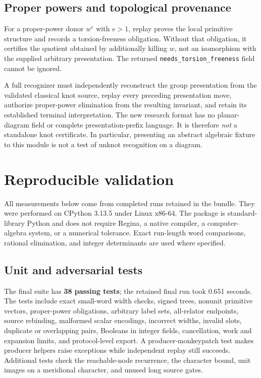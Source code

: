 \documentclass[11pt,letterpaper]{article}
\theoremstyle{definition}
\theoremstyle{remark}\newtheorem{remark}[theorem]{Remark}
\newcommand{\code}[1]{\texttt{\small #1}}
\begin{document}
\subsection{Proper powers and topological provenance}

For a proper-power donor $w^e$ with $e>1$, replay proves the local primitive
structure and records a torsion-freeness obligation. Without that obligation,
it certifies the quotient obtained by additionally killing $w$, not an
isomorphism with the supplied arbitrary presentation. The returned
\code{needs\_torsion\_freeness} field cannot be ignored.

A full recognizer must independently reconstruct the group presentation from
the validated classical knot source, replay every preceding presentation
move, authorize proper-power elimination from the resulting invariant, and
retain its established terminal interpretation. The new research format has
no planar-diagram field or complete presentation-prefix language. It is
therefore \emph{not} a standalone knot certificate. In particular, presenting
an abstract algebraic fixture to this module is not a test of unknot
recognition on a diagram.

\section{Reproducible validation}
\label{sec:audit}

All measurements below come from completed runs retained in the bundle. They
were performed on CPython 3.13.5 under Linux x86-64. The package is
standard-library Python and does not require Regina, a native compiler, a
computer-algebra system, or a numerical tolerance. Exact run-length word
comparisons, rational elimination, and integer determinants are used where
specified.

\subsection{Unit and adversarial tests}

The final suite has \textbf{38 passing tests}; the retained final run took
0.651 seconds. The tests include exact small-word width checks, signed trees,
nonunit primitive vectors, proper-power obligations, arbitrary label sets,
all-relator endpoints, source rebinding, malformed scalar encodings, incorrect
widths, invalid slots, duplicate or overlapping pairs, Booleans in integer
fields, cancellation, work and expansion limits, and protocol-level export.
A producer-monkeypatch test makes producer helpers raise exceptions while
independent replay still succeeds. Additional tests check the reachable-node
recurrence, the character bound, unit images on a meridional character, and
unused long source gates.
\end{document}
